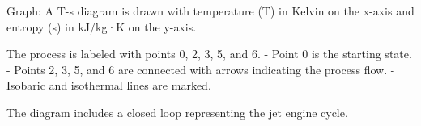 Graph:  
A T-s diagram is drawn with temperature (T) in Kelvin on the x-axis and entropy (s) in kJ/kg·K on the y-axis.  

The process is labeled with points 0, 2, 3, 5, and 6.  
- Point 0 is the starting state.  
- Points 2, 3, 5, and 6 are connected with arrows indicating the process flow.  
- Isobaric and isothermal lines are marked.  

The diagram includes a closed loop representing the jet engine cycle.